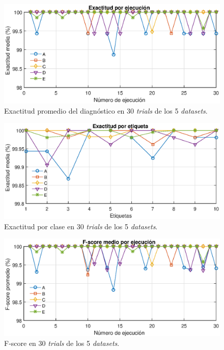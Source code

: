 \documentclass[12pt]{article}
\begin{document}
\begin{figure}[ht]
  \centering
    \includegraphics[scale=0.9]{./AccG.eps}
  \caption{Exactitud promedio del diagnóstico en 30 \textit{trials} de los 5 \textit{datasets}.}
  \label{fig:exg}
\end{figure}

\begin{figure}[ht]
  \centering
    \includegraphics[scale=0.9]{./Acc.eps}
  \caption{Exactitud por clase en 30 \textit{trials} de los 5 \textit{datasets}.}
  \label{fig:exact}
\end{figure}

\begin{figure}[ht]
  \centering
    \includegraphics[scale=0.9]{./FscG.eps}
  \caption{F-score en 30 \textit{trials} de los 5 \textit{datasets}.}
  \label{fig:fscG}
\end{figure}
\end{document}
